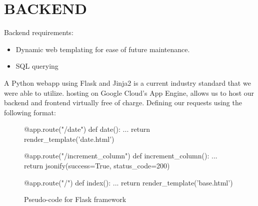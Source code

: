 \documentclass{article}
\begin{document}
\section{BACKEND}
\begin{flushleft}
Backend requirements:
\begin{itemize}
\item Dynamic web templating for ease of future maintenance.
\item SQL querying
\end{itemize}
A Python webapp using Flask and Jinja2 is a current industry standard that we were able to utilize. hosting on Google Cloud's App Engine, allows us to host our backend and frontend virtually free of charge.\break\break
Defining our requests using the following format:
\begin{figure}[H]
\begin{python}
    @app.route("/date")
    def date():
        ...
        return render_template('date.html')
    
    @app.route("/increment_column")
    def increment_column():
        ...
        return jsonify(success=True, status_code=200)

    @app.route("/")
    def index():
        ...
        return render_template('base.html')
\end{python}
\caption{Pseudo-code for Flask framework}
\end{figure}
\end{flushleft}

\pagebreak
\end{document}
